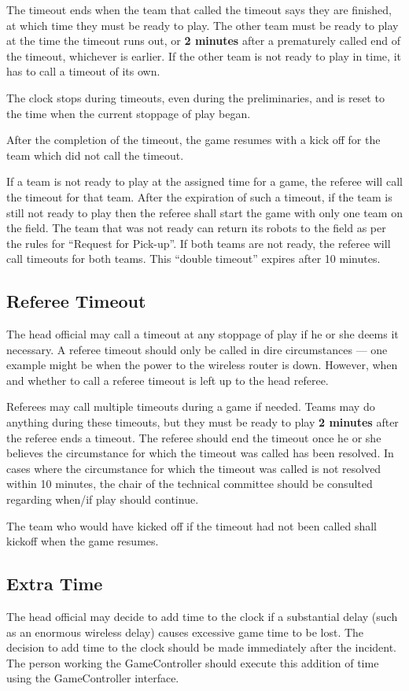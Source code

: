 \documentclass[12pt]{article}
\begin{document}
The timeout ends when the team that called the timeout says they are finished, at which time they must be ready to play. The other team must be ready to play at the time the timeout runs out, or \textbf{2 minutes} after a prematurely called end of the timeout, whichever is earlier. If the other team is not ready to play in time, it has to call a timeout of its own.

The clock stops during timeouts, even during the preliminaries, and is reset to the time when the current stoppage of play began.

After the completion of the timeout, the game resumes with a kick off for the team which did not call the timeout.

If a team is not ready to play at the assigned time for a game, the referee will call the timeout for that team. After the expiration of such a timeout, if the team is still not ready to play then the referee shall start the game with only one team on the field.  The team that was not ready can return its robots to the field as per the rules for ``Request for Pick-up''. If both teams are not ready, the referee will call timeouts for both teams. This ``double timeout'' expires after 10 minutes.

\subsection{Referee Timeout}
\label{sec:referee_timeout}
The head official may call a timeout at any stoppage of play if he or she deems it necessary.  A referee timeout should only be called in dire circumstances --- one example might be when the power to the wireless router is down.  However, when and whether to call a referee timeout is left up to the head referee.

Referees may call multiple timeouts during a game if needed.  Teams may do anything during these timeouts, but they must be ready to play \textbf{2 minutes} after the referee ends a timeout.  The referee should end the timeout once he or she believes the circumstance for which the timeout was called has been resolved.  In cases where the circumstance for which the timeout was called is not resolved within 10 minutes, the chair of the technical committee should be consulted regarding when/if play should continue.

The team who would have kicked off if the timeout had not been called shall kickoff when the game resumes.

\subsection{Extra Time}
\label{sec:extra_time}
The head official may decide to add time to the clock if a substantial delay (such as an enormous wireless delay) causes excessive game time to be lost.  The decision to add time to the clock should be made immediately after the incident.  The person working the GameController should execute this addition of time using the GameController interface.
\end{document}
